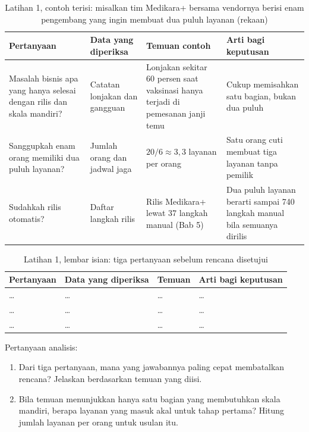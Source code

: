 \begin{table}[!htb]
  \centering
  \caption{Latihan 1, contoh terisi: misalkan tim Medikara+ bersama vendornya berisi enam pengembang
           yang ingin membuat dua puluh layanan (rekaan)}
  \label{tab:ch07-lat1-contoh}
  \footnotesize
  \begin{tabularx}{\textwidth}{>{\raggedright\arraybackslash}p{2.8cm} >{\raggedright\arraybackslash}p{2.2cm} >{\raggedright\arraybackslash}X >{\raggedright\arraybackslash}X}
    \hline
    \textbf{Pertanyaan} & \textbf{Data yang diperiksa} & \textbf{Temuan contoh} & \textbf{Arti
      bagi keputusan} \\ \hline
    Masalah bisnis apa yang hanya selesai dengan rilis dan skala mandiri? & Catatan lonjakan dan
      gangguan & Lonjakan sekitar 60 persen saat vaksinasi hanya terjadi di pemesanan janji temu &
      Cukup memisahkan satu bagian, bukan dua puluh \\ \hline
    Sanggupkah enam orang memiliki dua puluh layanan? & Jumlah orang dan jadwal jaga & $20/6
      \approx 3{,}3$ layanan per orang & Satu orang cuti membuat tiga layanan tanpa pemilik \\ \hline
    Sudahkah rilis otomatis? & Daftar langkah rilis & Rilis Medikara+ lewat 37 langkah manual
      (Bab 5) & Dua puluh layanan berarti sampai 740 langkah manual bila semuanya dirilis \\ \hline
  \end{tabularx}
\end{table}

\begin{table}[!htb]
  \centering
  \caption{Latihan 1, lembar isian: tiga pertanyaan sebelum rencana disetujui}
  \label{tab:ch07-lat1-hasil}
  \footnotesize
  \begin{tabularx}{\textwidth}{>{\raggedright\arraybackslash}p{2.8cm} >{\raggedright\arraybackslash}p{2.2cm} >{\raggedright\arraybackslash}X >{\raggedright\arraybackslash}X}
    \hline
    \textbf{Pertanyaan} & \textbf{Data yang diperiksa} & \textbf{Temuan} & \textbf{Arti bagi
      keputusan} \\ \hline
    \dots & \dots & \dots & \dots \\ \hline
    \dots & \dots & \dots & \dots \\ \hline
    \dots & \dots & \dots & \dots \\ \hline
  \end{tabularx}
\end{table}

Pertanyaan analisis:
\begin{enumerate}
  \item Dari tiga pertanyaan, mana yang jawabannya paling cepat membatalkan rencana? Jelaskan
        berdasarkan temuan yang diisi.
  \item Bila temuan menunjukkan hanya satu bagian yang membutuhkan skala mandiri, berapa layanan
        yang masuk akal untuk tahap pertama? Hitung jumlah layanan per orang untuk usulan itu.
\end{enumerate}

